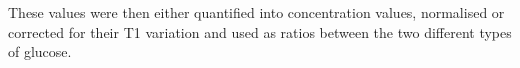 \documentclass[class=article, crop=false]{standalone}
\begin{document}


These values were then either quantified into concentration values, normalised or corrected for their T1 variation and used as ratios between the two different types of glucose.

\end{document}
